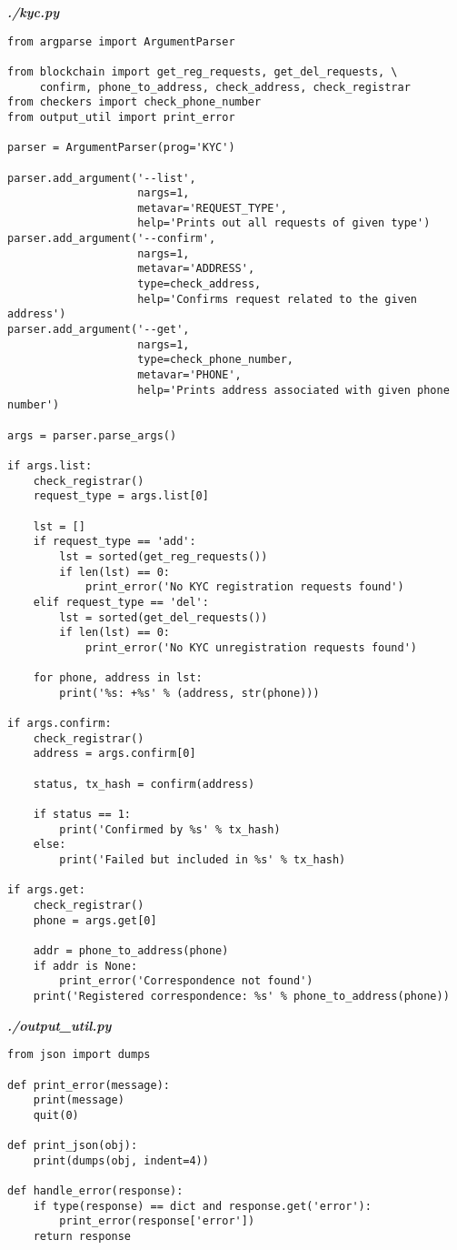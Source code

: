 \textit{\textbf{./kyc.py}}
\begin{verbatim}
from argparse import ArgumentParser

from blockchain import get_reg_requests, get_del_requests, \
     confirm, phone_to_address, check_address, check_registrar
from checkers import check_phone_number
from output_util import print_error

parser = ArgumentParser(prog='KYC')

parser.add_argument('--list',
                    nargs=1,
                    metavar='REQUEST_TYPE',
                    help='Prints out all requests of given type')
parser.add_argument('--confirm',
                    nargs=1,
                    metavar='ADDRESS',
                    type=check_address,
                    help='Confirms request related to the given address')
parser.add_argument('--get',
                    nargs=1,
                    type=check_phone_number,
                    metavar='PHONE',
                    help='Prints address associated with given phone number')

args = parser.parse_args()

if args.list:
    check_registrar()
    request_type = args.list[0]

    lst = []
    if request_type == 'add':
        lst = sorted(get_reg_requests())
        if len(lst) == 0:
            print_error('No KYC registration requests found')
    elif request_type == 'del':
        lst = sorted(get_del_requests())
        if len(lst) == 0:
            print_error('No KYC unregistration requests found')

    for phone, address in lst:
        print('%s: +%s' % (address, str(phone)))

if args.confirm:
    check_registrar()
    address = args.confirm[0]

    status, tx_hash = confirm(address)

    if status == 1:
        print('Confirmed by %s' % tx_hash)
    else:
        print('Failed but included in %s' % tx_hash)

if args.get:
    check_registrar()
    phone = args.get[0]

    addr = phone_to_address(phone)
    if addr is None:
        print_error('Correspondence not found')
    print('Registered correspondence: %s' % phone_to_address(phone))
\end{verbatim}

\textit{\textbf{./output\_util.py}}
\begin{verbatim}
from json import dumps

def print_error(message):
    print(message)
    quit(0)

def print_json(obj):
    print(dumps(obj, indent=4))

def handle_error(response):
    if type(response) == dict and response.get('error'):
        print_error(response['error'])
    return response
\end{verbatim}


